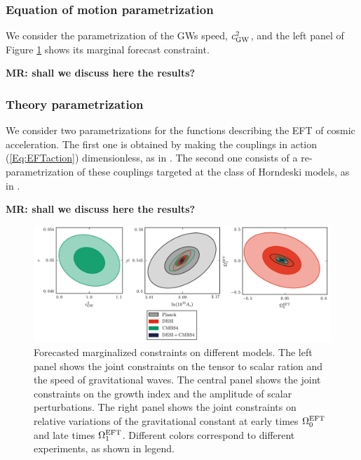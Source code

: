 \subsubsection{Equation of motion parametrization}

We consider the parametrization of the GWs speed, $c^2_{\rm GW}$, and the left panel of Figure \ref{fig:MixedDEG} shows its marginal forecast constraint. 

{\bf MR: shall we discuss here the results?}

\subsubsection{Theory parametrization}

We consider two parametrizations for the functions describing the EFT of cosmic acceleration. The first one is obtained by making the couplings in action (\ref{Eq:EFTaction}) dimensionless, as in \cite{Hu:2014oga}. The second one consists of a re-parametrization of these couplings targeted at the class of Horndeski models, as in \cite{Bellini:2014fua}.

{\bf MR: shall we discuss here the results?}



\begin{figure}[!tb]
\begin{center}
\includegraphics[width=1.0\textwidth]{DarkEnergy/2_mixed}
\caption{Forecasted marginalized constraints on different models. The left panel shows the joint constraints on the tensor to scalar ration and the speed of gravitational waves. The central panel shows the joint constraints on the growth index and the amplitude of scalar perturbations. The right panel shows the joint constraints on relative variations of the gravitational constant at early times $\Omega_0^{\rm EFT}$ and late times $\Omega_1^{\rm EFT}$. Different colors correspond to different experiments, as shown in legend.}\label{fig:MixedDEG}
\end{center}
\end{figure}

